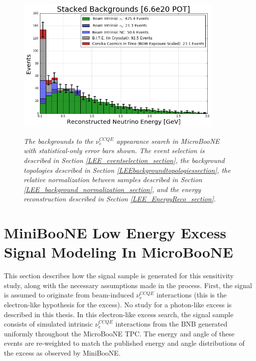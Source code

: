 \begin{figure}[ht!]
\centering
\includegraphics[width=0.9\textwidth]{Figures/LEE_stackedbackgrounds_nosignal_withAnalysisCuts.png}\\
\caption{\textit{The backgrounds to the $\nu_e^{CCQE}$ appearance search in MicroBooNE with statistical-only error bars shown. The event selection is described in Section \ref{LEE_eventselection_section}, the background topologies described in Section \ref{LEEbackgroundtopologiessection}, the relative normalization between samples described in Section \ref{LEE_background_normalization_section}, and the energy reconstruction described in Section \ref{LEE_EnergyReco_section}.}}
\label{LEE_stackedbackgrounds_nosignal_withanalysiscuts_fig}
\end{figure}





\section{MiniBooNE Low Energy Excess Signal Modeling In MicroBooNE}\label{MBLEESignalModeling_section}
This section describes how the signal sample is generated for this sensitivity study, along with the necessary assumptions made in the process. First, the signal is assumed to originate from beam-induced $\nu_e^{CCQE}$ interactions (this is the electron-like hypothesis for the excess). No study for a photon-like excess is described in this thesis. In this electron-like excess search, the signal sample consists of simulated intrinsic $\nu_e^{CCQE}$ interactions from the BNB generated uniformly throughout the MicroBooNE TPC. The energy and angle of these events are re-weighted to match the published energy and angle distributions of the excess as observed by MiniBooNE. \\

